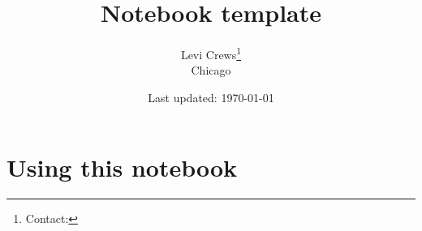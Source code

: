 \documentclass[11pt]{report}
\title{\textbf{Notebook template}}
\author{
Levi Crews\thanks{Contact: \crewsemail} \\ {Chicago}
}
\date{Last updated: \printdayoff\today}
\begin{document}
\begin{titlepage}
\maketitle
\end{titlepage}

\renewcommand{\thechapter}{\Alph{chapter}}
\setcounter{tocdepth}{1}
\tableofcontents
\etocsettocstyle{}{} %



\chapter{Using this notebook}

% 
\end{document}

